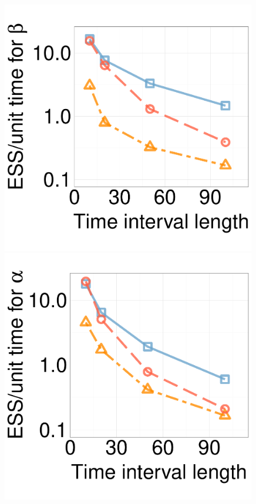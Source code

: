 \begin{figure}[H]
\begin{minipage}[hp]{0.24\linewidth}
    \includegraphics [width=0.99\textwidth, angle=0]{figs/new_experiment_figs/ESS_vs_t_beta_fixobservation.pdf}
  \end{minipage}
  \begin{minipage}[hp]{0.24\linewidth}
  \centering
    \includegraphics [width=0.99\textwidth, angle=0]{figs/new_experiment_figs/ESS_vs_t_alpha.pdf}

\end{minipage}
\end{figure}
